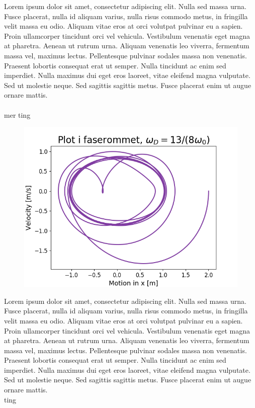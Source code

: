\documentclass[norsk,a4paper,12pt]{article}
\begin{document}
Lorem ipsum dolor sit amet, consectetur adipiscing elit. Nulla sed massa urna. Fusce placerat, nulla id aliquam varius, nulla risus commodo metus, in fringilla velit massa eu odio. Aliquam vitae eros at orci volutpat pulvinar eu a sapien. Proin ullamcorper tincidunt orci vel vehicula. Vestibulum venenatis eget magna at pharetra. Aenean ut rutrum urna. Aliquam venenatis leo viverra, fermentum massa vel, maximus lectus. Pellentesque pulvinar sodales massa non venenatis. Praesent lobortis consequat erat ut semper. Nulla tincidunt ac enim sed imperdiet. Nulla maximus dui eget eros laoreet, vitae eleifend magna vulputate. Sed ut molestie neque. Sed sagittis sagittis metus. Fusce placerat enim ut augue ornare mattis.
\\
\\
mer ting
\begin{figure}[H]
\includegraphics[scale=0.8]{Oppgave5del1.png}
\end{figure}


Lorem ipsum dolor sit amet, consectetur adipiscing elit. Nulla sed massa urna. Fusce placerat, nulla id aliquam varius, nulla risus commodo metus, in fringilla velit massa eu odio. Aliquam vitae eros at orci volutpat pulvinar eu a sapien. Proin ullamcorper tincidunt orci vel vehicula. Vestibulum venenatis eget magna at pharetra. Aenean ut rutrum urna. Aliquam venenatis leo viverra, fermentum massa vel, maximus lectus. Pellentesque pulvinar sodales massa non venenatis. Praesent lobortis consequat erat ut semper. Nulla tincidunt ac enim sed imperdiet. Nulla maximus dui eget eros laoreet, vitae eleifend magna vulputate. Sed ut molestie neque. Sed sagittis sagittis metus. Fusce placerat enim ut augue ornare mattis.
\\
ting
\end{document}
